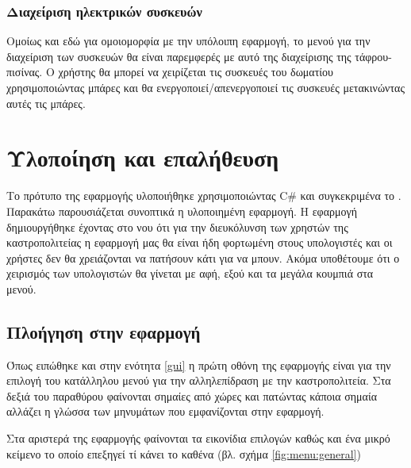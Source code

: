 \documentclass{assignment}
\begin{document}
\subsubsection{Διαχείριση ηλεκτρικών συσκευών}

Ομοίως και εδώ για ομοιομορφία με την υπόλοιπη εφαρμογή, το μενού για την διαχείριση των συσκευών θα είναι παρεμφερές με αυτό της διαχείρισης της τάφρου-πισίνας. Ο χρήστης θα μπορεί να χειρίζεται τις συσκευές του δωματίου χρησιμοποιώντας μπάρες και θα ενεργοποιεί/απενεργοποιεί τις συσκευές μετακινώντας αυτές τις μπάρες.

\section{Υλοποίηση και επαλήθευση}

Το πρότυπο της εφαρμογής υλοποιήθηκε χρησιμοποιώντας C\# και συγκεκριμένα το . Παρακάτω παρουσιάζεται συνοπτικά η υλοποιημένη εφαρμογή. Η εφαρμογή δημιουργήθηκε έχοντας στο νου ότι για την διευκόλυνση των χρηστών της καστροπολιτείας η εφαρμογή μας θα είναι ήδη φορτωμένη στους υπολογιστές και οι χρήστες δεν θα χρειάζονται να πατήσουν κάτι για να μπουν. Ακόμα υποθέτουμε ότι ο χειρισμός των υπολογιστών θα γίνεται με αφή, εξού και τα μεγάλα κουμπιά στα μενού.

\subsection{Πλοήγηση στην εφαρμογή}

Όπως ειπώθηκε και στην ενότητα \ref{gui} η πρώτη οθόνη της εφαρμογής είναι για την επιλογή του κατάλληλου μενού για την αλληλεπίδραση με την καστροπολιτεία. Στα δεξιά του παραθύρου φαίνονται σημαίες από χώρες και πατώντας κάποια σημαία αλλάζει η γλώσσα των μηνυμάτων που εμφανίζονται στην εφαρμογή.

Στα αριστερά της εφαρμογής φαίνονται τα εικονίδια επιλογών καθώς και ένα μικρό κείμενο το οποίο επεξηγεί τί κάνει το καθένα (βλ. σχήμα \ref{fig:menu:general})
\end{document}
